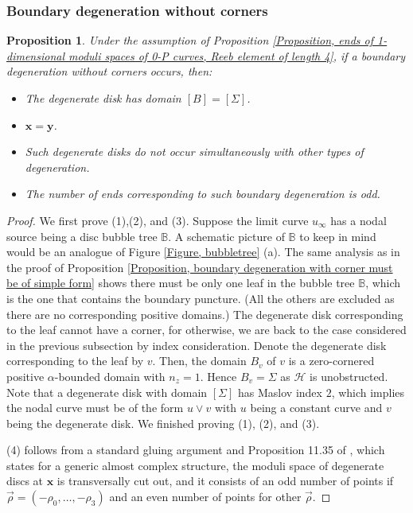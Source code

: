 \documentclass{amsart}
\newtheorem{prop}[thm]{Proposition}
\theoremstyle{definition}
\theoremstyle{remark}
\numberwithin{equation}{section}
\numberwithin{equation}{section} \makeatletter
\begin{document}
\subsubsection{Boundary degeneration without corners}
\begin{prop}\label{Proposition, boundary degeneration without corner}
Under the assumption of Proposition \ref{Proposition, ends of 1-dimensional moduli spaces of 0-P curves, Reeb element of length 4}, if a boundary degeneration without corners occurs, then:
\begin{itemize}
	\item[(1)] The degenerate disk has domain $[B]=[\Sigma]$.
	\item[(2)] $\bm{x}=\bm{y}$.
	\item[(3)] Such degenerate disks do not occur simultaneously with other types of degeneration.
	\item[(4)] The number of ends corresponding to such boundary degeneration is odd.
\end{itemize}
\end{prop}
\begin{proof}
We first prove (1),(2), and (3). Suppose the limit curve $u_\infty$ has a nodal source being a disc bubble tree $\mathbb{B}$. A schematic picture of $\mathbb{B}$ to keep in mind would be an analogue of Figure \ref{Figure, bubbletree} (a). The same analysis as in the proof of Proposition \ref{Proposition, boundary degeneration with corner must be of simple form} shows there must be only one leaf in the bubble tree $\mathbb{B}$, which is the one that contains the boundary puncture. (All the others are excluded as there are no corresponding positive domains.) The degenerate disk corresponding to the leaf cannot have a corner, for otherwise, we are back to the case considered in the previous subsection by index consideration. Denote the degenerate disk corresponding to the leaf by $v$. Then, the domain $B_v$ of $v$ is a zero-cornered positive $\alpha$-bounded domain with $n_z=1$. Hence $B_v=\Sigma$ as $\mathcal{H}$ is unobstructed. Note that a degenerate disk with domain $[\Sigma]$ has Maslov index $2$, which implies the nodal curve must be of the form $u\vee v$ with $u$ being a constant curve and $v$ being the degenerate disk. We finished proving (1), (2), and (3).

(4) follows from a standard gluing argument and Proposition 11.35 of \cite{LOT18}, which states for a generic almost complex structure, the moduli space of degenerate discs at $\bm{x}$ is transversally cut out, and it consists of an odd number of points if $\overrightarrow{\rho}=(-\rho_0,\ldots,-\rho_3)$ and an even number of points for other $\overrightarrow{\rho}$. 
\end{proof}
\end{document}
